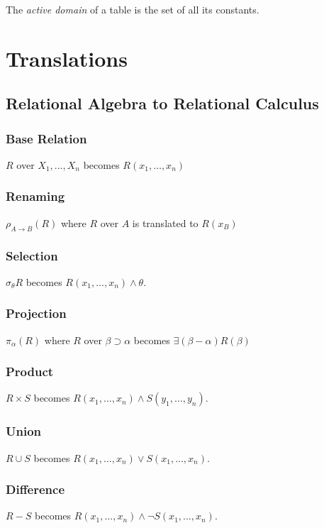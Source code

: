 \documentclass{article}
\begin{document}
The \textit{active domain} of a table is the set of all its constants.

\section{Translations}

\subsection{Relational Algebra to Relational Calculus}

\subsubsection*{Base Relation}

$R$ over $X_1,...,X_n$ becomes $R(x_1, \ldots, x_n)$

\subsubsection*{Renaming}
$\rho_{A\rightarrow B}(R)$ where $R$ over $A$ is translated to $R(x_B)$

\subsubsection*{Selection}
$\sigma_{\theta} R$ becomes $R(x_1, \ldots, x_n) \wedge \theta$.

\subsubsection*{Projection}
$\pi_{\alpha}(R)$ where $R$ over $\beta \supset \alpha$ becomes $\exists (\beta-\alpha) R(\beta)$

\subsubsection*{Product}
$R \times S$ becomes $R(x_1, \ldots, x_n) \wedge S(y_1, \ldots, y_n)$.

\subsubsection*{Union}
$R \cup S$ becomes $R(x_1, \ldots, x_n) \vee S(x_1, \ldots, x_n)$.

\subsubsection*{Difference}
$R - S$ becomes $R(x_1, \ldots, x_n) \wedge \neg S(x_1, \ldots, x_n)$.
\end{document}
